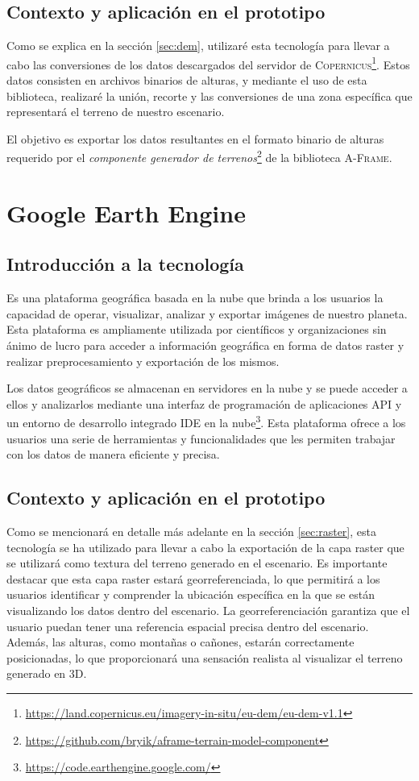 \documentclass[a4paper, 11pt]{book}
\begin{document}
\subsection{Contexto y aplicación en el prototipo}
Como se explica en la sección \ref{sec:dem}, utilizaré esta tecnología para llevar a cabo las conversiones de los datos descargados del servidor de \textsc{Copernicus}\footnote{\url{https://land.copernicus.eu/imagery-in-situ/eu-dem/eu-dem-v1.1}}. Estos datos consisten en archivos binarios de alturas, y mediante el uso de esta biblioteca, realizaré la unión, recorte y las conversiones de una zona específica que representará el terreno de nuestro escenario.

El objetivo es exportar los datos resultantes en el formato binario de alturas requerido por el \emph{componente generador de terrenos}\footnote{\url{https://github.com/bryik/aframe-terrain-model-component}} de la biblioteca \textsc{A-Frame}.
\section{Google Earth Engine}
\subsection{Introducción a la tecnología}
Es una plataforma geográfica basada en la nube que brinda a los usuarios la capacidad de operar, visualizar, analizar y exportar imágenes  de nuestro planeta. Esta plataforma es ampliamente utilizada por científicos y organizaciones sin ánimo de lucro para acceder a información geográfica en forma de datos raster y realizar preprocesamiento y exportación de los mismos.

Los datos geográficos se almacenan en servidores en la nube y se puede acceder a ellos y analizarlos mediante una interfaz de programación de aplicaciones \textsc{API} y un entorno de desarrollo integrado \textsc{IDE} en la nube\footnote{\url{https://code.earthengine.google.com/}}. 
Esta plataforma ofrece a los usuarios una serie de herramientas y funcionalidades que les permiten trabajar con los datos de manera eficiente y precisa.
\subsection{Contexto y aplicación en el prototipo}
Como se mencionará en detalle más adelante en la sección \ref{sec:raster}, esta tecnología se ha utilizado para llevar a cabo la exportación de la capa raster que se utilizará como textura del terreno generado en el escenario. Es importante destacar que esta capa raster estará georreferenciada, lo que permitirá a los usuarios identificar y comprender la ubicación específica en la que se están visualizando los datos dentro del escenario.
La georreferenciación garantiza que el usuario puedan tener una referencia espacial precisa dentro del escenario. Además, las alturas, como montañas o cañones, estarán correctamente posicionadas, lo que proporcionará una sensación realista al visualizar el terreno generado en \textsc{3D}.
\end{document}
